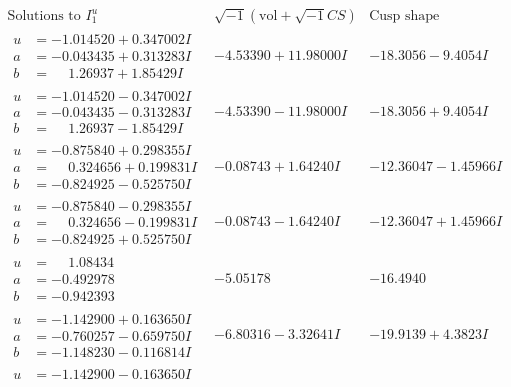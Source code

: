 \documentclass[1p]{elsarticle_modified}
\theoremstyle{definition}
\newcommand{\I}{\sqrt{-1}}
\begin{document}
$$\begin{array}{c|c|c}  
\text{Solutions to }I^u_{1}& \I (\text{vol} + \sqrt{-1}CS) & \text{Cusp shape}\\
 \hline 
\begin{aligned}
u &= -1.014520 + 0.347002 I \\
a &= -0.043435 + 0.313283 I \\
b &= \phantom{-}1.26937 + 1.85429 I\end{aligned}
 & -4.53390 + 11.98000 I & -18.3056 - 9.4054 I \\ \hline\begin{aligned}
u &= -1.014520 - 0.347002 I \\
a &= -0.043435 - 0.313283 I \\
b &= \phantom{-}1.26937 - 1.85429 I\end{aligned}
 & -4.53390 - 11.98000 I & -18.3056 + 9.4054 I \\ \hline\begin{aligned}
u &= -0.875840 + 0.298355 I \\
a &= \phantom{-}0.324656 + 0.199831 I \\
b &= -0.824925 - 0.525750 I\end{aligned}
 & -0.08743 + 1.64240 I & -12.36047 - 1.45966 I \\ \hline\begin{aligned}
u &= -0.875840 - 0.298355 I \\
a &= \phantom{-}0.324656 - 0.199831 I \\
b &= -0.824925 + 0.525750 I\end{aligned}
 & -0.08743 - 1.64240 I & -12.36047 + 1.45966 I \\ \hline\begin{aligned}
u &= \phantom{-}1.08434\phantom{ +0.000000I} \\
a &= -0.492978\phantom{ +0.000000I} \\
b &= -0.942393\phantom{ +0.000000I}\end{aligned}
 & -5.05178\phantom{ +0.000000I} & -16.4940\phantom{ +0.000000I} \\ \hline\begin{aligned}
u &= -1.142900 + 0.163650 I \\
a &= -0.760257 - 0.659750 I \\
b &= -1.148230 - 0.116814 I\end{aligned}
 & -6.80316 - 3.32641 I & -19.9139 + 4.3823 I \\ \hline\begin{aligned}
u &= -1.142900 - 0.163650 I \\

\end{aligned}
\end{array}$$
\end{document}
